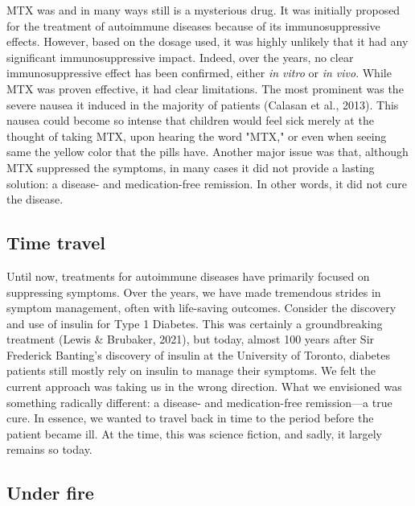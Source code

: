 \documentclass[authordate, editorial]{jote-new-article}
\begin{document}
	MTX was and in many ways still is a mysterious drug. It was initially proposed for the treatment of autoimmune diseases because of its immunosuppressive effects. However, based on the dosage used, it was highly unlikely that it had any significant immunosuppressive impact. Indeed, over the years, no clear immunosuppressive effect has been confirmed, either \emph{in vitro} or \emph{in vivo}. While MTX was proven effective, it had clear limitations. The most prominent was the severe nausea it induced in the majority of patients (Calasan et al., 2013). This nausea could become so intense that children would feel sick merely at the thought of taking MTX, upon hearing the word "MTX," or even when seeing same the yellow color that the pills have. Another major issue was that, although MTX suppressed the symptoms, in many cases it did not provide a lasting solution: a disease- and medication-free remission. In other words, it did not cure the disease.







	\subsection{Time travel}



	Until now, treatments for autoimmune diseases have primarily focused on suppressing symptoms. Over the years, we have made tremendous strides in symptom management, often with life-saving outcomes. Consider the discovery and use of insulin for Type 1 Diabetes. This was certainly a groundbreaking treatment (Lewis \& Brubaker, 2021), but today, almost 100 years after Sir Frederick Banting's discovery of insulin at the University of Toronto, diabetes patients still mostly rely on insulin to manage their symptoms. We felt the current approach was taking us in the wrong direction. What we envisioned was something radically different: a disease- and medication-free remission—a true cure. In essence, we wanted to travel back in time to the period before the patient became ill. At the time, this was science fiction, and sadly, it largely remains so today.







	\subsection{Under fire}
\end{document}
